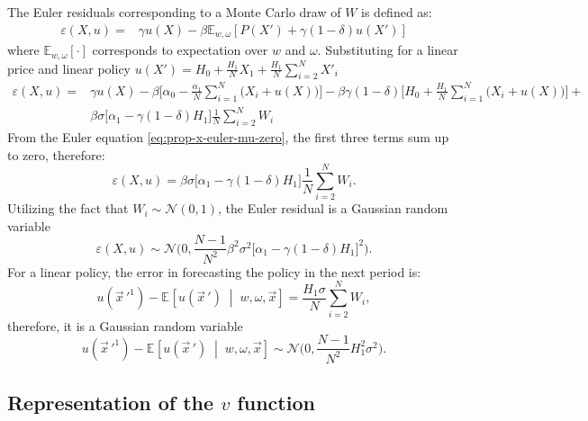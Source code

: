\documentclass[12pt]{article}
\newcommand{\condexpec}[3][]{\ensuremath{\mathbb{E}_{#1}\left[{#2} \; \middle| \; {#3} \right]}}
\newcommand{\expec}[2][]{\ensuremath{\mathbb{E}_{{#1}}\left[ {#2} \right]}}
\begin{document}
The Euler residuals corresponding to a Monte Carlo draw of $W$ is defined as:
\begin{align*}
\varepsilon(X,u) = &\gamma u(X) - \beta \expec[w,\omega]{P(X')+\gamma (1-\delta) u(X')} 
\end{align*}
where $\expec[w,\omega]{\cdot}$ corresponds to expectation over $w$ and $\omega$. Substituting for a linear price and linear policy $u(X') = H_0 + \frac{H_1}{N} X_1 + \frac{H_1}{N}\sum_{i=2}^{N} X'_i$ 
\begin{align*}
	\varepsilon(X,u) = &\gamma u(X) - \beta \Big[\alpha_0-\frac{\alpha_1}{N} \sum_{i=1}^N\big(X_i+u(X)\big) \Big] - \beta \gamma (1-\delta) \Big[H_0 + \frac{H_1}{N} \sum_{i=1}^N \big(X_i+u(X)\big)\Big] + \\
	& \beta \sigma \Big[\alpha_1-\gamma (1-\delta) H_1\Big] \frac{1}{N} \sum_{i=2}^N W_i
\end{align*}
From the Euler equation \cref{eq:prop-x-euler-mu-zero}, the first three terms sum up to zero, therefore:
\begin{equation*}
\varepsilon(X,u) = \beta \sigma \Big[\alpha_1-\gamma(1-\delta)H_1\Big]\frac{1}{N}\sum_{i=2}^{N}W_i.
\end{equation*}
Utilizing the fact that $W_i\sim \mathcal{N}(0,1)$, the Euler residual is a Gaussian random variable 
\begin{equation*}
\varepsilon(X,u) \sim \mathcal{N}\Big(0,\frac{N-1}{N^2} \beta^2\sigma^2\big[\alpha_1-\gamma(1-\delta)H_1\big]^2\Big).
\end{equation*}
For a linear policy, the error in forecasting the policy in the next period is:
\begin{equation*}
		u(\vec{x}\,'^1) - \condexpec{u(\vec{x}\,')}{w,\omega, \vec{x}}  = \frac{H_1 \sigma}{N} \sum_{i=2}^N W_i,
\end{equation*}
therefore, it is a Gaussian random variable 
\begin{equation*}
	u(\vec{x}\,'^1) - \condexpec{u(\vec{x}\,')}{w,\omega, \vec{x}}   \sim \mathcal{N}\Big(0,\frac{N-1}{N^2} H_1^2 \sigma^2 \Big).
\end{equation*}
\subsection{Representation of the $v$ function}\label{sec:v-LQ-representation}
\end{document}
